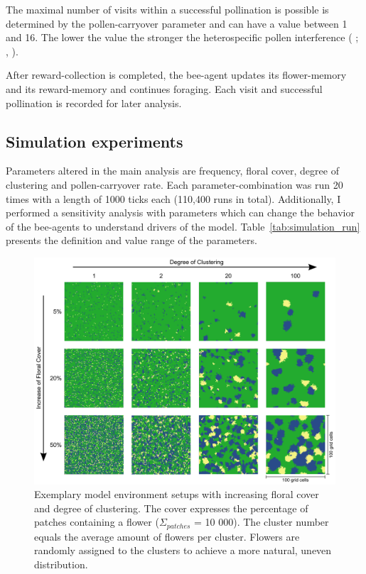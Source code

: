 The maximal number of visits within a successful pollination is possible is determined by the pollen-carryover parameter and can have a value between 1 and 16. The lower the value the stronger the heterospecific pollen interference ( \citealt{campbell1986predicting}; \citealt{benadi2012population},  \citealt{montgomery2009pollen}).

After reward-collection is completed, the bee-agent updates its flower-memory and its reward-memory and continues foraging. Each visit and successful pollination is recorded for later analysis. 


\subsection*{Simulation experiments}

Parameters altered in the main analysis are frequency, floral cover, degree of clustering and pollen-carryover rate. Each parameter-combination was run 20 times with a length of 1000 ticks each (110,400 runs in total). Additionally, I performed a sensitivity analysis with parameters which can change the behavior of the bee-agents to understand drivers of the model. Table~\ref{tab:simulation_run} presents the definition and value range of the parameters.
 

\begin{figure} [h] %
	\centering
	\includegraphics[width=15cm]{Images/cluster}
	\caption{ Exemplary model environment setups with increasing floral cover and degree of clustering. The cover expresses the percentage of patches containing a flower ($\Sigma_{patches}$ = 10 000). The cluster number equals the average amount of flowers per cluster. Flowers are randomly assigned to the clusters to achieve a more natural, uneven distribution. }
	\label{fig:cluster}
\end{figure}

